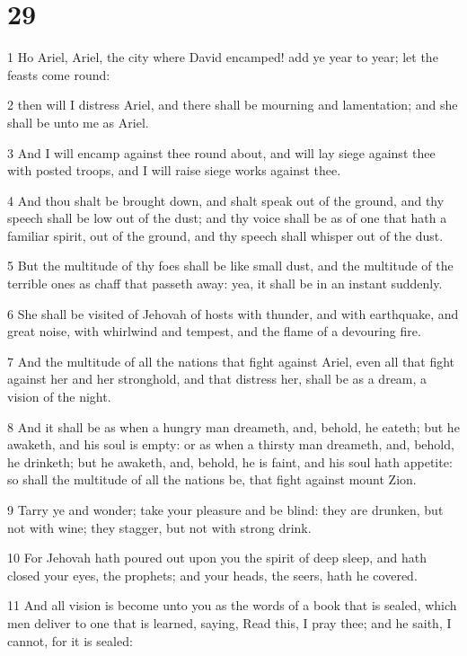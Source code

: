\chapter{29}

\par 1 Ho Ariel, Ariel, the city where David encamped! add ye year to year; let the feasts come round:
\par 2 then will I distress Ariel, and there shall be mourning and lamentation; and she shall be unto me as Ariel.
\par 3 And I will encamp against thee round about, and will lay siege against thee with posted troops, and I will raise siege works against thee.
\par 4 And thou shalt be brought down, and shalt speak out of the ground, and thy speech shall be low out of the dust; and thy voice shall be as of one that hath a familiar spirit, out of the ground, and thy speech shall whisper out of the dust.
\par 5 But the multitude of thy foes shall be like small dust, and the multitude of the terrible ones as chaff that passeth away: yea, it shall be in an instant suddenly.
\par 6 She shall be visited of Jehovah of hosts with thunder, and with earthquake, and great noise, with whirlwind and tempest, and the flame of a devouring fire.
\par 7 And the multitude of all the nations that fight against Ariel, even all that fight against her and her stronghold, and that distress her, shall be as a dream, a vision of the night.
\par 8 And it shall be as when a hungry man dreameth, and, behold, he eateth; but he awaketh, and his soul is empty: or as when a thirsty man dreameth, and, behold, he drinketh; but he awaketh, and, behold, he is faint, and his soul hath appetite: so shall the multitude of all the nations be, that fight against mount Zion.
\par 9 Tarry ye and wonder; take your pleasure and be blind: they are drunken, but not with wine; they stagger, but not with strong drink.
\par 10 For Jehovah hath poured out upon you the spirit of deep sleep, and hath closed your eyes, the prophets; and your heads, the seers, hath he covered.
\par 11 And all vision is become unto you as the words of a book that is sealed, which men deliver to one that is learned, saying, Read this, I pray thee; and he saith, I cannot, for it is sealed:
